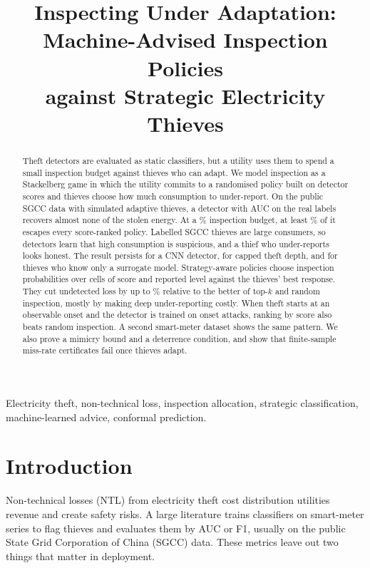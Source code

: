 \documentclass[journal]{IEEEtran}
\newcommand{\todo}[1]{{\color{red}[\textbf{TODO:} #1]}}
\begin{document}
\title{Inspecting Under Adaptation: Machine-Advised Inspection Policies\\ against Strategic Electricity Thieves}
\author{\IEEEauthorblockN{\todo{Author names and affiliations}}}
\maketitle

\begin{abstract}
Theft detectors are evaluated as static classifiers, but a utility uses them to spend a small inspection budget against thieves who can adapt. We model inspection as a Stackelberg game in which the utility commits to a randomised policy built on detector scores and thieves choose how much consumption to under-report. On the public SGCC data with simulated adaptive thieves, a detector with AUC \rAucLevel{} on the real labels recovers almost none of the stolen energy. At a \rBmid\% inspection budget, at least \rEscapeMin\% of it escapes every score-ranked policy. Labelled SGCC thieves are large consumers, so detectors learn that high consumption is suspicious, and a thief who under-reports looks honest. The result persists for a CNN detector, for capped theft depth, and for thieves who know only a surrogate model. Strategy-aware policies choose inspection probabilities over cells of score and reported level against the thieves' best response. They cut undetected loss by up to \rSeGainRelMaxSOne\% relative to the better of top-$k$ and random inspection, mostly by making deep under-reporting costly. When theft starts at an observable onset and the detector is trained on onset attacks, ranking by score also beats random inspection. A second smart-meter dataset shows the same pattern. We also prove a mimicry bound and a deterrence condition, and show that finite-sample miss-rate certificates fail once thieves adapt.
\end{abstract}

\begin{IEEEkeywords}
Electricity theft, non-technical loss, inspection allocation, strategic classification, machine-learned advice, conformal prediction.
\end{IEEEkeywords}

\section{Introduction}
Non-technical losses (NTL) from electricity theft cost distribution utilities revenue and create safety risks. A large literature trains classifiers on smart-meter series to flag thieves \cite{nagi2010,jokar2016,zheng2018} and evaluates them by AUC or F1, usually on the public State Grid Corporation of China (SGCC) data. These metrics leave out two things that matter in deployment.
\end{document}
